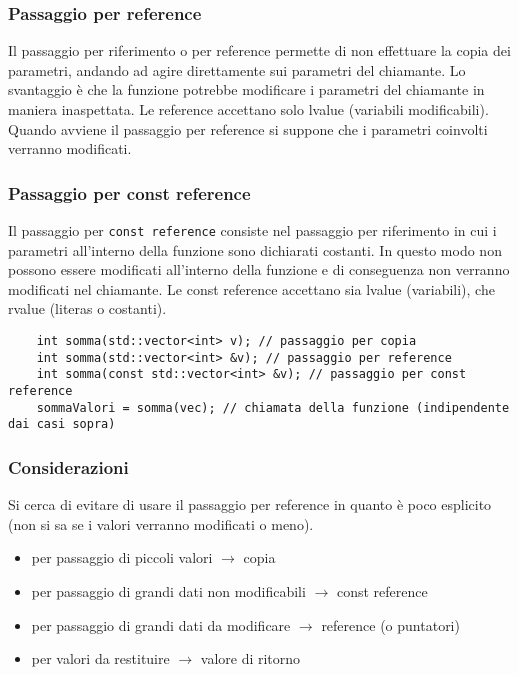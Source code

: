 \documentclass[a4paper]{article}
\begin{document}
\subsubsection*{Passaggio per reference}
Il passaggio per riferimento o per reference permette di non effettuare la copia dei parametri, andando ad agire direttamente sui
parametri del chiamante. Lo svantaggio è che la funzione potrebbe modificare i parametri del chiamante in maniera inaspettata. Le
reference accettano solo lvalue (variabili modificabili). Quando avviene il passaggio per reference si suppone che i parametri
coinvolti verranno modificati.

\subsubsection*{Passaggio per const reference}
Il passaggio per \verb|const reference| consiste nel passaggio per riferimento in cui i parametri all'interno della funzione
sono dichiarati costanti. In questo modo non possono essere modificati all'interno della funzione e di conseguenza non verranno
modificati nel chiamante. Le const reference accettano sia lvalue (variabili), che rvalue (literas o costanti).

\begin{lstlisting}
	int somma(std::vector<int> v); // passaggio per copia
	int somma(std::vector<int> &v); // passaggio per reference
	int somma(const std::vector<int> &v); // passaggio per const reference
	sommaValori = somma(vec); // chiamata della funzione (indipendente dai casi sopra)
\end{lstlisting}

\subsubsection*{Considerazioni}
Si cerca di evitare di usare il passaggio per reference in quanto è poco esplicito (non si sa se i valori verranno modificati o
meno).

\begin{itemize}
	\item per passaggio di piccoli valori \(\rightarrow\) copia
	\item per passaggio di grandi dati non modificabili \(\rightarrow\) const reference
	\item per passaggio di grandi dati da modificare \(\rightarrow\) reference (o puntatori)
	\item per valori da restituire \(\rightarrow\) valore di ritorno
\end{itemize}
\end{document}
